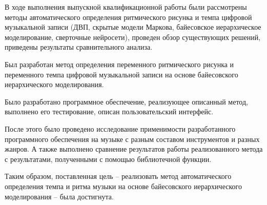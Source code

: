 
В ходе выполнения выпускной квалификационной работы были рассмотрены методы автоматического определения ритмического рисунка и темпа цифровой музыкальной записи (ДВП, скрытые модели Маркова, байесовское иерархическое моделирование, сверточные нейросети), проведен обзор существующих решений, приведены результаты сравнительного анализа.

Был разработан метод определения переменного ритмического рисунка и переменного темпа цифровой музыкальной записи на основе байесовского иерархического моделирования.

Было разработано программное обеспечение, реализующее описанный метод, выполнено его тестирование, описан пользовательский интерфейс.

После этого было проведено исследование применимости разработанного программного обеспечения на музыке с разным составом инструментов и разных жанров. А также выполнено сравнение результатов работы реализованного метода с результатами, полученными с помощью библиотечной функции.

Таким образом, поставленная цель -- реализовать метод автоматического определения темпа и ритма музыки на основе байесовского иерархического моделирования -- была достигнута.